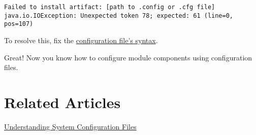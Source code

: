\begin{verbatim}
Failed to install artifact: [path to .config or .cfg file]
java.io.IOException: Unexpected token 78; expected: 61 (line=0, pos=107)
\end{verbatim}

To resolve this, fix the
\hyperref[configuration-file-formats]{configuration file's syntax}.

Great! Now you know how to configure module components using
configuration files.

\section{Related Articles}\label{related-articles}

\href{/docs/7-1/user/-/knowledge_base/u/understanding-system-configuration-files}{Understanding
System Configuration Files}
